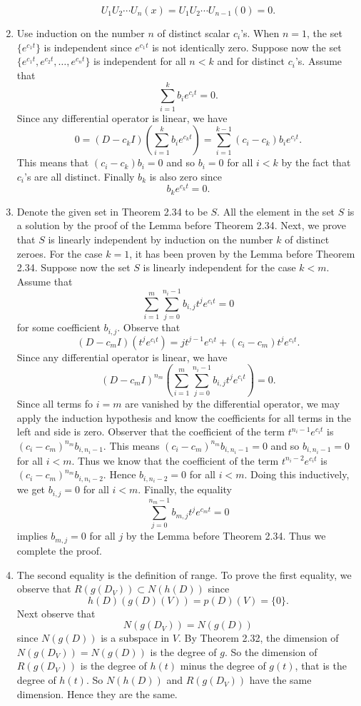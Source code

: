 \begin{enumerate}
\[U_1U_2\cdots U_n(x)=U_1U_2\cdots U_{n-1}(0)=0.\]
\item Use induction on the number $n$ of distinct scalar $c_i$'s. When $n=1$, the set $\{e^{c_1t}\}$ is independent since $e^{c_1t}$ is not identically zero. Suppose now the set $\{e^{c_1t},e^{c_2t},\ldots ,e^{c_nt}\}$ is independent for all $n<k $ and for distinct $c_i$'s. Assume that 
\[\sum_{i=1}^k{b_ie^{c_it}}=0.\]
Since any differential operator is linear, we have 
\[0=(D-c_kI)(\sum_{i=1}^k{b_ie^{c_kt}})=\sum_{i=1}^{k-1}{(c_i-c_k)b_ie^{c_it}}.\]
This means that $(c_i-c_k)b_i=0$ and so $b_i=0$ for all $i<k$ by the fact that $c_i$'s are all distinct. Finally $b_k$ is also zero since 
\[b_ke^{c_kt}=0.\]
\item Denote the given set in Theorem 2.34 to be $S$. All the element in the set $S$ is a solution by the proof of the Lemma before Theorem 2.34. Next, we prove that $S$ is linearly independent by induction on the number $k$ of distinct zeroes. For the case $k=1$, it has been proven by the Lemma before Theorem 2.34. Suppose now the set $S$ is linearly independent for the case $k< m$. Assume that 
\[\sum_{i=1}^m{\sum_{j=0}^{n_i-1}{b_{i,j}t^je^{c_it}}}=0\]
for some coefficient $b_{i,j}$. Observe that 
\[(D-c_mI)(t^je^{c_it})=jt^{j-1}e^{c_it}+(c_i-c_m)t^je^{c_it}.\]
Since any differential operator is linear, we have 
\[(D-c_mI)^{n_m}(\sum_{i=1}^m{\sum_{j=0}^{n_i-1}{b_{i,j}t^je^{c_it}}})=0.\]
Since all terms fo $i=m$ are vanished by the differential operator, we may apply the induction hypothesis and know the coefficients for all terms in the left and side is zero. Observer that the coefficient of the term $t^{n_i-1}e^{c_it}$ is $(c_i-c_m)^{n_m}b_{i,n_i-1}$. This means $(c_i-c_m)^{n_m}b_{i,n_i-1}=0$ and so $b_{i,n_i-1}=0$ for all $i<m$. Thus we know that the coefficient of the term $t^{n_i-2}e^{c_it}$ is $(c_i-c_m)^{n_m}b_{i,n_i-2}$. Hence $b_{i,n_i-2}=0$ for all $i<m$. Doing this inductively, we get $b_{i,j}=0$ for all $i<m$. Finally, the equality 
\[\sum_{j=0}^{n_m-1}{b_{m,j}t^je^{c_mt}}=0\]
implies $b_{m,j}=0$ for all $j$ by the Lemma before Theorem 2.34. Thus we complete the proof.
\item The second equality is the definition of range. To prove the first equality, we observe that $R(g(D_V))\subset N(h(D))$ since 
\[h(D)(g(D)(V))=p(D)(V)=\{0\}.\]
Next observe that 
\[N(g(D_V))=N(g(D))\]
since $N(g(D))$ is a subspace in $V$. By Theorem 2.32, the dimension of $N(g(D_V))=N(g(D))$ is the degree of $g$. So the dimension of $R(g(D_V))$ is the degree of $h(t)$ minus the degree of $g(t)$, that is the degree of $h(t)$. So $N(h(D))$ and $R(g(D_V))$ have the same dimension. Hence they are the same.

\end{enumerate}

